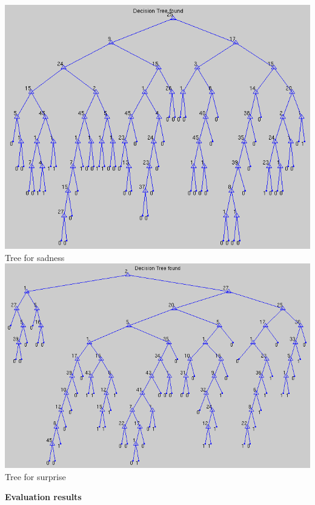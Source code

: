 \documentclass[12pt]{article}
\begin{document}
\begin{center}
  \includegraphics[scale=0.28]{report-images/tree5.png} \\
  Tree for sadness \\
  \vspace{\baselineskip}
  \includegraphics[scale=0.28]{report-images/tree6.png} \\
  Tree for surprise
\end{center}

\newpage

{\bf Evaluation results} \\
\end{document}
